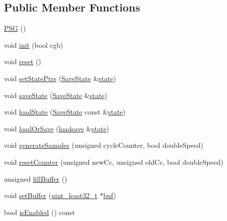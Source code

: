 \subsection*{Public Member Functions}
\begin{DoxyCompactItemize}
\item 
\hyperlink{classgambatte_1_1PSG_aa3dd35671196e7caf03ab488fa6768ed}{P\+SG} ()
\item 
void \hyperlink{classgambatte_1_1PSG_a8c1f386bd9da8395aeb66dee7059b7fe}{init} (bool cgb)
\item 
void \hyperlink{classgambatte_1_1PSG_af899b7b1de13a7abb0f1aa3e33be7dd1}{reset} ()
\item 
void \hyperlink{classgambatte_1_1PSG_ae232a6e30755b72d1af0d11e03729dc3}{set\+State\+Ptrs} (\hyperlink{structgambatte_1_1SaveState}{Save\+State} \&\hyperlink{ppu_8cpp_a2f2eca6997ee7baf8901725ae074d45b}{state})
\item 
void \hyperlink{classgambatte_1_1PSG_a2b892219d0ea5bf3f7954e2e68e3f7f6}{save\+State} (\hyperlink{structgambatte_1_1SaveState}{Save\+State} \&\hyperlink{ppu_8cpp_a2f2eca6997ee7baf8901725ae074d45b}{state})
\item 
void \hyperlink{classgambatte_1_1PSG_a302cc5f1d4500deaee2ba342e6470b47}{load\+State} (\hyperlink{structgambatte_1_1SaveState}{Save\+State} const \&\hyperlink{ppu_8cpp_a2f2eca6997ee7baf8901725ae074d45b}{state})
\item 
void \hyperlink{classgambatte_1_1PSG_aa40355bad44e2ba8981d42160b92e622}{load\+Or\+Save} (\hyperlink{classgambatte_1_1loadsave}{loadsave} \&\hyperlink{ppu_8cpp_a2f2eca6997ee7baf8901725ae074d45b}{state})
\item 
void \hyperlink{classgambatte_1_1PSG_a9bcdc6e6a7ba05527a6d09b2cb0ceaca}{generate\+Samples} (unsigned cycle\+Counter, bool double\+Speed)
\item 
void \hyperlink{classgambatte_1_1PSG_ab3ad75652ca8508592a7a55df874d4ca}{reset\+Counter} (unsigned new\+Cc, unsigned old\+Cc, bool double\+Speed)
\item 
unsigned \hyperlink{classgambatte_1_1PSG_a81ef34b06def903ab8a24ab485d07b95}{fill\+Buffer} ()
\item 
void \hyperlink{classgambatte_1_1PSG_a7c5a2474671eac749dc35959f76762d3}{set\+Buffer} (\hyperlink{namespacegambatte_a0639f09fccfbbd5a8e0796318768e370}{uint\+\_\+least32\+\_\+t} $\ast$\hyperlink{ioapi_8h_a8ad8a13c88886b9f623034ff88570adb}{buf})
\item 
bool \hyperlink{classgambatte_1_1PSG_ac066ac94f030d1fe6bcc56d8fdfc34b2}{is\+Enabled} () const

\end{DoxyCompactItemize}
